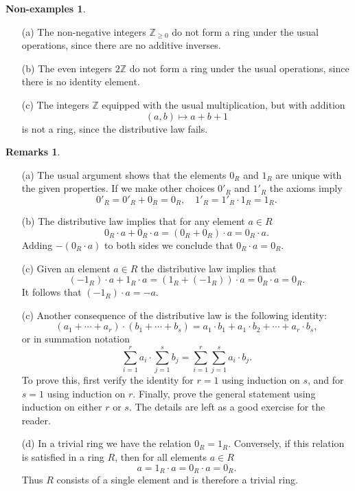\documentclass [12pt,oneside,a4paper,mathscr]{amsart}
\theoremstyle{definition}
\newtheorem{remarks}[thm]{Remarks}
\newtheorem{nonexamples}[thm]{Non-examples}
\renewcommand{\geq}{\geqslant}
\newcommand{\Z}{\mathbb Z}
\begin{document}
\begin{nonexamples}
\begin{itemize}
\item[(a)] The non-negative integers $\Z_{\geq 0}$ do not form a ring under the usual operations, since there are no additive inverses.
\smallskip
\item[(b)] The even integers $2\Z$ do not form  a ring under the usual operations, since there is no identity element.
\smallskip
\item[(c)] The integers $\Z$ equipped with the usual multiplication, but with addition \[(a,b)\mapsto a+b+1\] is not a ring, since the distributive law fails.
\end{itemize}
\end{nonexamples}

\begin{remarks}\label{remm}
\begin{itemize}\item[(a)]
The usual argument shows that the elements $0_R$ and $1_R$ are unique with the given properties. If we make other choices $0'_R$ and $1'_R$ the axioms imply 
\[0'_R=0'_R+0_R = 0_R, \quad 1'_R=1'_R\cdot 1_R = 1_R.\]
\item[(b)]
The distributive law implies that for any element $a\in R$
\[0_R \cdot a + 0_R\cdot a = (0_R + 0_R)\cdot a = 0_R \cdot a.\]
Adding $-(0_R \cdot a)$ to both sides we conclude that $0_R\cdot a = 0_R$.
\smallskip
\item[(c)] Given an element $a\in R$ the distributive law implies that
\[(-1_R)\cdot a + 1_R\cdot a=(1_R+(-1_R))\cdot a = 0_R \cdot a=0_R.\]
It follows that $(-1_R)\cdot a = -a$.\smallskip
\item[(c)]Another consequence of the distributive law is the following identity:
\[(a_1+ \cdots +a_r)\cdot (b_1+ \cdots +b_s)=a_1\cdot b_1 + a_1 \cdot b_2 + \cdots +a_r\cdot b_s,\]
or in summation notation
\[\sum_{i=1}^r a_i \cdot \sum_{j=1}^s b_j = \sum_{i=1}^r \sum _{j=1}^s a_i\cdot b_j.\]
To prove this, first verify the identity for $r=1$ using induction on $s$, and for $s=1$ using induction on $r$. Finally, prove the general statement using induction on either $r$ or $s$. The details are left as a good exercise for the reader.
\smallskip

\item[(d)]
In a trivial ring we have the relation $0_R=1_R$.
Conversely, if this relation is satisfied in a  ring $R$,  then for all elements $a\in R$  \[a= 1_R\cdot a= 0_R\cdot a = 0_R.\] Thus $R$ consists of a single element and is therefore a trivial ring.
\end{itemize}
\end{remarks}
\end{document}
